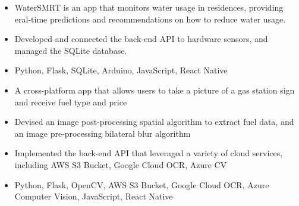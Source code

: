 \documentclass[11pt,letterpaper]{article}
\begin{document}
  \ifwatersmrt
    {\fontsize{12}{12}}

    \begin{itemize}
      \item{WaterSMRT is an app that monitors water usage in residences, providing eral-time predictions and recommendations on how to reduce water usage.}

      \item{Developed and connected the back-end API to hardware sensors, and managed the SQLite database.}

      \item{
        {}
        Python, Flask, SQLite, Arduino, JavaScript, React Native
      }
    \end{itemize}
  \fi

  \ifmilesnap
    {\fontsize{12}{12}}

    \begin{itemize}
      \item{A cross-platform app that allows users to take a picture of a gas station sign and receive fuel type and price}

      \item{Devised an image post-processing spatial algorithm to extract fuel data, and an image pre-processing bilateral blur algorithm}

      \item{Implemented the back-end API that leveraged a variety of cloud services, including AWS S3 Bucket, Google Cloud OCR, Azure CV}

      \item{
        {}
        Python, Flask, OpenCV, AWS S3 Bucket, Google Cloud OCR, Azure Computer Vision, JavaScript, React Native
      }
    \end{itemize}
  \fi

  \ifdeeplearningfortroposphericozoneprediction
    {\fontsize{12}{12}}
\end{document}
